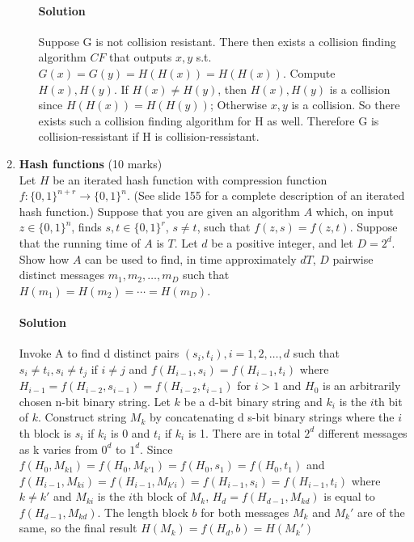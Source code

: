 \documentclass[11pt]{article}
\begin{document}
\begin{enumerate}
\begin{enumerate}
\paragraph{Solution}
Suppose G is not collision resistant. There then exists a collision finding algorithm $CF$ that outputs $x,y$ s.t. $G(x)=G(y)=H(H(x))=H(H(x))$. Compute $H(x),H(y)$. If $H(x) \neq H(y)$, then $H(x), H(y)$ is a collision since $H(H(x))=H(H(y))$; Otherwise $x, y$ is a collision. So there exists such a collision finding algorithm for H as well. Therefore G is collision-ressistant if H is collision-ressistant.
\end{enumerate}


\item {\bf Hash functions} (10 marks)\\
Let $H$ be an iterated hash function with compression function
$f : \{0,1\}^{n+r} \rightarrow \{0,1\}^n$. (See slide 155 for a complete
description of an iterated hash function.) Suppose that you are
given an algorithm $A$ which, on input $z \in \{0,1\}^n$, finds
$s,t \in \{0,1\}^r$, $s \neq t$, such that $f(z,s)=f(z,t)$.
Suppose that the running time of $A$ is $T$. Let $d$ be a positive
integer, and let $D=2^d$. Show how $A$ can be used to find, in time
approximately $d T$, $D$ pairwise distinct messages
$m_1,m_2,\ldots,m_D$ such that $H(m_1)=H(m_2)=\cdots=H(m_D)$.
\paragraph{Solution}
Invoke A to find d distinct pairs $(s_i,t_i),i=1,2,\dots,d$ such that $s_i \neq t_i, s_i \neq t_j$ if $i\neq j$ and $f(H_{i-1},s_i)=f(H_{i-1},t_i)$ where $H_{i-1}=f(H_{i-2},s_{i-1})=f(H_{i-2},t_{i-1})$ for $i > 1$ and $H_0$ is an arbitrarily chosen n-bit binary string. Let $k$ be a d-bit binary string and $k_i$ is the $i$th bit of $k$. Construct string $M_k$ by concatenating d s-bit binary strings where the $i$th block is $s_i$ if $k_i$ is 0 and $t_i$ if $k_i$ is 1. There are in total $2^d$ different messages as k varies from $0^d$ to $1^d$.
Since $f(H_0,M_{k1})=f(H_0,M_{k'1})=f(H_0,s_1)=f(H_0,t_1)$ and $f(H_{i-1},M_{ki})=f(H_{i-1},M_{k'i})=f(H_{i-1},s_i)=f(H_{i-1},t_i)$ where $k\neq k'$ and $M_{ki}$ is the $i$th block of $M_k$, $H_d=f(H_{d-1},M_{kd})$ is equal to $f(H_{d-1},M_{kd})$. The length block $b$ for both messages $M_k$ and $M_k'$ are of the same, so the final result $H(M_k) = f(H_d,b) = H(M_k')$


\end{enumerate}
\end{document}
